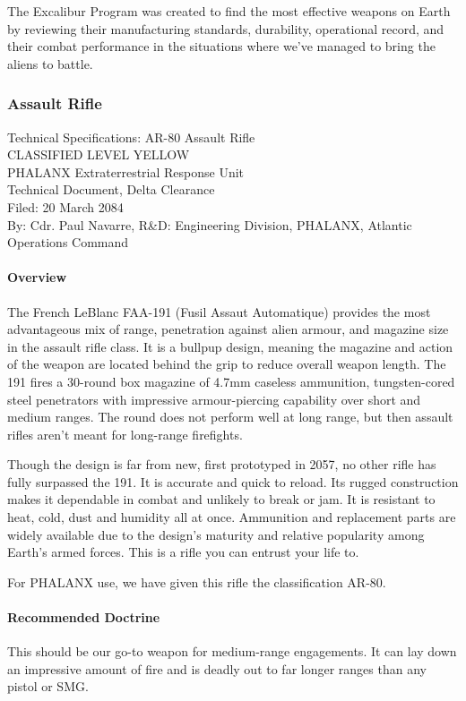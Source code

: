 The Excalibur Program was created to find the most effective weapons on Earth by reviewing their manufacturing standards, durability, operational record, and their combat performance in the situations where we've managed to bring the aliens to battle.

\subsubsection*{Assault Rifle}
Technical Specifications: AR-80 Assault Rifle\\
CLASSIFIED LEVEL YELLOW\\
PHALANX Extraterrestrial Response Unit\\
Technical Document, Delta Clearance\\
Filed: 20 March 2084\\
By: Cdr. Paul Navarre, R&D: Engineering Division, PHALANX, Atlantic Operations Command\\
\paragraph*{Overview}
The French LeBlanc FAA-191 (Fusil Assaut Automatique) provides the most advantageous mix of range, penetration against alien armour, and magazine size in the assault rifle class. It is a bullpup design, meaning the magazine and action of the weapon are located behind the grip to reduce overall weapon length. The 191 fires a 30-round box magazine of 4.7mm caseless ammunition, tungsten-cored steel penetrators with impressive armour-piercing capability over short and medium ranges. The round does not perform well at long range, but then assault rifles aren't meant for long-range firefights.

Though the design is far from new, first prototyped in 2057, no other rifle has fully surpassed the 191. It is accurate and quick to reload. Its rugged construction makes it dependable in combat and unlikely to break or jam. It is resistant to heat, cold, dust and humidity all at once. Ammunition and replacement parts are widely available due to the design's maturity and relative popularity among Earth's armed forces. This is a rifle you can entrust your life to.

For PHALANX use, we have given this rifle the classification AR-80.
\paragraph*{Recommended Doctrine}
This should be our go-to weapon for medium-range engagements. It can lay down an impressive amount of fire and is deadly out to far longer ranges than any pistol or SMG.

